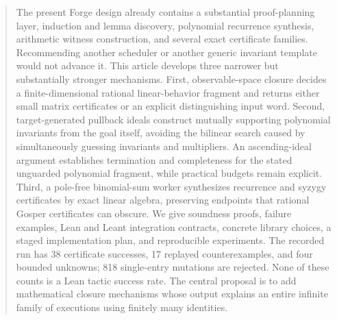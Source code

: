 \documentclass[11pt,a4paper]{article}
\theoremstyle{definition}\newtheorem{definition}[theorem]{Definition}
\theoremstyle{remark}\newtheorem{remark}[theorem]{Remark}
\begin{document}
\begin{abstract}
The present Forge design already contains a substantial proof-planning layer,
induction and lemma discovery, polynomial recurrence synthesis, arithmetic
witness construction, and several exact certificate families. Recommending
another scheduler or another generic invariant template would not advance it.
This article develops three narrower but substantially stronger mechanisms.
First, observable-space closure decides a finite-dimensional rational
linear-behavior fragment and returns either small matrix certificates or an
explicit distinguishing input word. Second, target-generated pullback ideals
construct mutually supporting polynomial invariants from the goal itself,
avoiding the bilinear search caused by simultaneously guessing invariants and
multipliers. An ascending-ideal argument establishes termination and completeness
for the stated unguarded polynomial fragment, while practical budgets remain
explicit. Third, a pole-free binomial-sum worker synthesizes recurrence and
syzygy certificates by exact linear algebra, preserving endpoints that rational
Gosper certificates can obscure. We give soundness proofs, failure examples,
Lean and Leant integration contracts, concrete library choices, a staged
implementation plan, and reproducible experiments. The recorded run has 38
certificate successes, 17 replayed counterexamples, and four bounded unknowns;
818 single-entry mutations are rejected. None of these counts is a Lean tactic
success rate. The central proposal is to add mathematical closure mechanisms
whose output explains an entire infinite family of executions using finitely
many identities.
\end{abstract}
\setcounter{tocdepth}{1}
\tableofcontents
\newpage







\appendix


\end{document}
